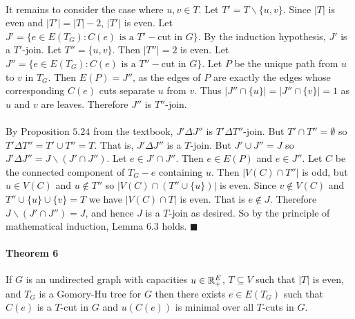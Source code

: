 \documentclass[letterpaper,12pt,oneside,onecolumn]{article}
\begin{document}
\paragraph{}
It remains to consider the case where $u, v \in T$. Let $T' = T \backslash\{u,v\}$. Since $|T|$ is even and $|T'| = |T| - 2$, $|T'|$ is even. Let $J' = \{e \in E(T_G) : C(e) \text{ is a } T'-\text{cut in } G\}$. By the induction hypothesis, $J'$ is a $T'$-join. Let $T'' = \{u,v\}$. Then $|T''| = 2$ is even. Let $J''=\{e \in E(T_G) : C(e) \text{ is a } T''-\text{cut in } G\}$. Let $P$ be the unique path from $u$ to $v$ in $T_G$. Then $E(P) = J''$, as the edges of $P$ are exactly the edges whose corresponding $C(e)$ cuts separate $u$ from $v$. Thus $|J'' \cap \{u\}| = |J''\cap \{v\}| = 1$ as $u$ and $v$ are leaves. Therefore $J''$ is $T''$-join.
\paragraph{}
By Proposition $5.24$ from the textbook, $J' \Delta J''$ is $T' \Delta T''$-join. But $T' \cap T'' = \emptyset$ so $T' \Delta T'' = T' \cup T'' = T$. That is, $J' \Delta J''$ is a $T$-join. But $J' \cup J'' = J$ so $J' \Delta J'' = J \backslash (J' \cap J'')$. Let $e \in J' \cap J''$. Then $e \in E(P)$ and $e \in J''$. Let $C$ be the connected component of $T_G - e$ containing $u$. Then $|V(C) \cap T''|$ is odd, but $u \in V(C)$ and $u \not\in T''$ so $|V(C) \cap (T'' \cup\{u\})|$ is even. Since $v \not\in V(C)$ and $T'' \cup\{u\} \cup \{v\} = T$ we have $|V(C) \cap T|$ is even. That is $e \not \in J$. Therefore $J \backslash (J' \cap J'') = J$, and hence $J$ is a $T$-join as desired. So by the principle of mathematical induction, Lemma $6.3$ holds. $\blacksquare$
\paragraph{Theorem 6}
If $G$ is an undirected graph with capacities $u \in \mathbb{R}_+^E$, $T\subseteq V$ such that $|T|$ is even, and $T_G$ is a Gomory-Hu tree for $G$ then there exists $e\in E(T_G)$ such that $C(e)$ is a $T$-cut in $G$ and $u(C(e))$ is minimal over all $T$-cuts in $G$.
\end{document}
